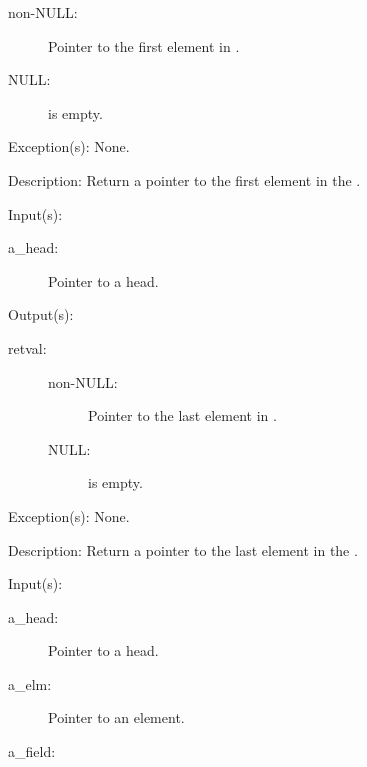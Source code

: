 \begin{capi}
\begin{capilist}
\begin{description}
\begin{description}
			\item[non-NULL: ]
				Pointer to the first element in .
			\item[NULL: ]
				 is empty.
			\end{description}
		\end{description}
	\item[Exception(s): ] None.
	\item[Description: ]
		Return a pointer to the first element in the .
	\end{capilist}
\label{ql_last}
	\begin{capilist}
	\item[Input(s): ]
		\begin{description}\item[]
		\item[a\_head: ]
			Pointer to a  head.
		\end{description}
	\item[Output(s): ]
		\begin{description}\item[]
		\item[retval: ]
			\begin{description}\item[]
			\item[non-NULL: ]
				Pointer to the last element in .
			\item[NULL: ]
				 is empty.
			\end{description}
		\end{description}
	\item[Exception(s): ] None.
	\item[Description: ]
		Return a pointer to the last element in the .
	\end{capilist}
\label{ql_next}
	\begin{capilist}
	\item[Input(s): ]
		\begin{description}\item[]
		\item[a\_head: ]
			Pointer to a \classname{ql} head.
		\item[a\_elm: ]
			Pointer to an element.
		\item[a\_field: ]

\end{description}
\end{capilist}
\end{capi}
